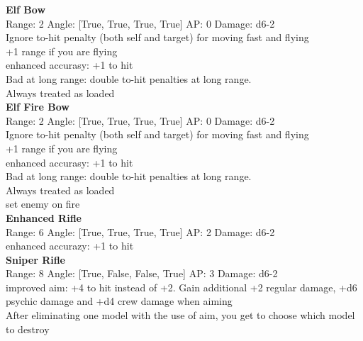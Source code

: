 {\bf Elf Bow } \\



Range: 2  Angle: [True, True, True, True] AP: 0 Damage: d6-2 \\
Ignore to-hit penalty (both self and target) for moving fast and flying\\ 
+1 range if you are flying\\ 
enhanced accurasy: +1 to hit\\ 
Bad at long range: double to-hit penalties at long range.\\ 
Always treated as loaded\\ 




{\bf Elf Fire Bow } \\



Range: 2  Angle: [True, True, True, True] AP: 0 Damage: d6-2 \\
Ignore to-hit penalty (both self and target) for moving fast and flying\\ 
+1 range if you are flying\\ 
enhanced accurasy: +1 to hit\\ 
Bad at long range: double to-hit penalties at long range.\\ 
Always treated as loaded\\ 
set enemy on fire\\ 




{\bf Enhanced Rifle } \\



Range: 6  Angle: [True, True, True, True] AP: 2 Damage: d6-2 \\
enhanced accurazy: +1 to hit\\ 




{\bf Sniper Rifle } \\



Range: 8  Angle: [True, False, False, True] AP: 3 Damage: d6-2 \\
improved aim: +4 to hit instead of +2. Gain additional +2 regular damage, +d6 psychic damage and +d4 crew damage when aiming\\ 
After eliminating one model with the use of aim, you get to choose which model to destroy\\ 




